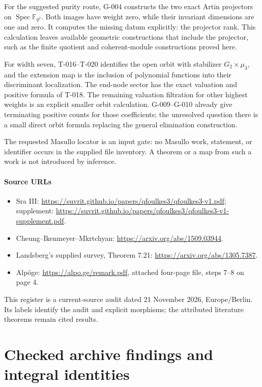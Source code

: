 \documentclass[
  10pt,
]{article}
\providecommand{\tightlist}{%
  \setlength{\itemsep}{0pt}\setlength{\parskip}{0pt}}
\providecommand{\tightlist}{\setlength{\itemsep}{0pt}\setlength{\parskip}{0pt}}
\begin{document}
For the suggested purity route, G-004 constructs the two exact Artin
projectors on \(\operatorname{Spec}\mathbb F_{q^2}\). Both images have
weight zero, while their invariant dimensions are one and zero. It
computes the missing datum explicitly: the projector rank. This
calculation leaves available geometric constructions that include the
projector, such as the finite quotient and coherent-module constructions
proved here.

For width seven, T-016--T-020 identifies the open orbit with stabilizer
\(G_2\times\mu_3\), and the extension map is the inclusion of polynomial
functions into their discriminant localization. The end-node sector has
the exact valuation and positive formula of T-018. The remaining
valuation filtration for other highest weights is an explicit smaller
orbit calculation. G-009--G-010 already give terminating positive counts
for those coefficients; the unresolved question there is a small direct
orbit formula replacing the general elimination construction.

The requested Masullo locator is an input gate: no Masullo work,
statement, or identifier occurs in the supplied file inventory. A
theorem or a map from such a work is not introduced by inference.

\subsection{Source URLs}\label{source-urls}

\begin{itemize}
\tightlist
\item
  Sra III:
  \url{https://suvrit.github.io/papers/qfoulkes3/qfoulkes3-v1.pdf};
  supplement:
  \url{https://suvrit.github.io/papers/qfoulkes3/qfoulkes3-v1-supplement.pdf}.
\item
  Cheung--Ikenmeyer--Mkrtchyan: \url{https://arxiv.org/abs/1509.03944}.
\item
  Landsberg's supplied survey, Theorem 7.21:
  \url{https://arxiv.org/abs/1305.7387}.
\item
  Alpöge: \url{https://alpo.ge/remark.pdf}, attached four-page file,
  steps 7--8 on page 4.
\end{itemize}

This register is a current-source audit dated 21 November 2026,
Europe/Berlin. Its labels identify the audit and explicit morphisms; the
attributed literature theorems remain cited results.

\part{Checked archive findings and integral identities}
\end{document}

